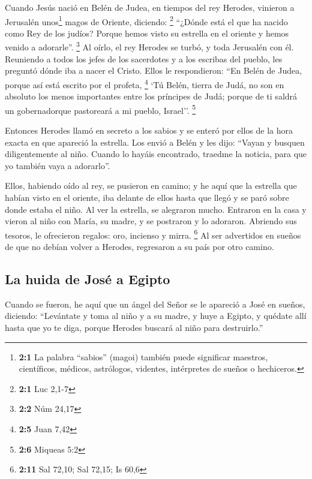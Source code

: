 \begin{paracol}{2}
 Cuando Jesús nació en Belén de Judea, en tiempos del rey
Herodes, vinieron a Jerusalén unos\footnote{\textbf{2:1} La palabra
  ``sabios'' (magoi) también puede significar maestros, científicos,
  médicos, astrólogos, videntes, intérpretes de sueños o hechiceros.}
magos de Oriente, diciendo: \footnote{\textbf{2:1} Luc 2,1-7}
 ``¿Dónde está el que ha nacido como Rey de los judíos?
Porque hemos visto su estrella en el oriente y hemos venido a
adorarle''. \footnote{\textbf{2:2} Núm 24,17}  Al oírlo,
el rey Herodes se turbó, y toda Jerusalén con él. 
Reuniendo a todos los jefes de los sacerdotes y a los escribas del
pueblo, les preguntó dónde iba a nacer el Cristo.  Ellos
le respondieron: ``En Belén de Judea, porque así está escrito por el
profeta, \footnote{\textbf{2:5} Juan 7,42}  `Tú Belén,
tierra de Judá, no son en absoluto los menos importantes entre los
príncipes de Judá; porque de ti saldrá un gobernadorque pastoreará a mi
pueblo, Israel''. \footnote{\textbf{2:6} Miqueas 5:2}

 Entonces Herodes llamó en secreto a los sabios y se
enteró por ellos de la hora exacta en que apareció la estrella.
 Los envió a Belén y les dijo: ``Vayan y busquen
diligentemente al niño. Cuando lo hayáis encontrado, traedme la noticia,
para que yo también vaya a adorarlo''.

 Ellos, habiendo oído al rey, se pusieron en camino; y he
aquí que la estrella que habían visto en el oriente, iba delante de
ellos hasta que llegó y se paró sobre donde estaba el niño.
 Al ver la estrella, se alegraron mucho. 
Entraron en la casa y vieron al niño con María, su madre, y se postraron
y lo adoraron. Abriendo sus tesoros, le ofrecieron regalos: oro,
incienso y mirra. \footnote{\textbf{2:11} Sal 72,10; Sal 72,15; Is 60,6}
 Al ser advertidos en sueños de que no debían volver a
Herodes, regresaron a su país por otro camino.

\hypertarget{la-huida-de-josuxe9-a-egipto}{%
\subsection{La huida de José a
Egipto}\label{la-huida-de-josuxe9-a-egipto}}

 Cuando se fueron, he aquí que un ángel del Señor se le
apareció a José en sueños, diciendo: ``Levántate y toma al niño y a su
madre, y huye a Egipto, y quédate allí hasta que yo te diga, porque
Herodes buscará al niño para destruirlo.''


\end{paracol}
